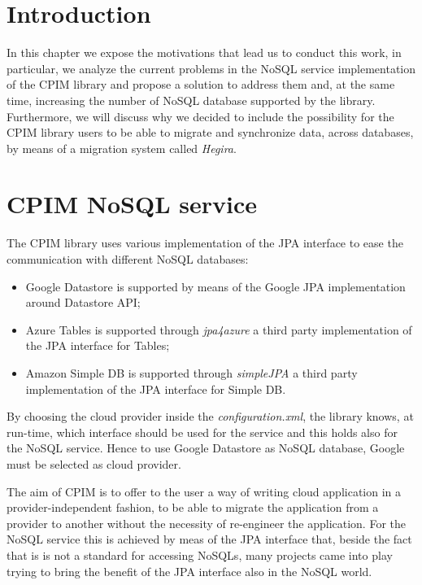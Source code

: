 \section{Introduction}
In this chapter we expose the motivations that lead us to conduct this work, in particular, we analyze the current problems in the NoSQL service implementation of the CPIM library and propose a solution to address them and, at the same time, increasing the number of NoSQL database supported by the library.
\noindent Furthermore, we will discuss why we decided to include the possibility for the CPIM library users to be able to migrate and synchronize data, across databases, by means of a migration system called \textit{Hegira}.

\section{CPIM NoSQL service}
The CPIM library uses various implementation of the JPA interface to ease the communication with different NoSQL databases:
\begin{itemize}
\item Google Datastore is supported by means of the Google JPA implementation around Datastore API;
\item Azure Tables is supported through \textit{jpa4azure} a third party implementation of the JPA interface for Tables;
\item Amazon Simple DB is supported through \textit{simpleJPA} a third party implementation of the JPA interface for Simple DB.
\end{itemize}
\noindent By choosing the cloud provider inside the \textit{configuration.xml}, the library knows, at run-time, which interface should be used for the service and this holds also for the NoSQL service. Hence to use Google Datastore as NoSQL database, Google must be selected as cloud provider.

\noindent The aim of CPIM is to offer to the user a way of writing cloud application in a provider-independent fashion, to be able to migrate the application from a provider to another without the necessity of re-engineer the application. For the NoSQL service this is achieved by meas of the JPA interface that, beside the fact that is is not a standard for accessing NoSQLs, many projects came into play trying to bring the benefit of the JPA interface also in the NoSQL world.

